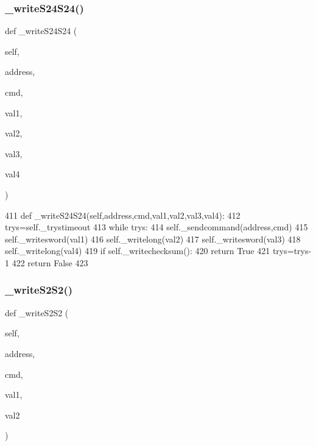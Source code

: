 \subsubsection{\texorpdfstring{\+\_\+write\+S24\+S24()}{\_writeS24S24()}}
{\footnotesize\ttfamily def \+\_\+write\+S24\+S24 (\begin{DoxyParamCaption}\item[{}]{self,  }\item[{}]{address,  }\item[{}]{cmd,  }\item[{}]{val1,  }\item[{}]{val2,  }\item[{}]{val3,  }\item[{}]{val4 }\end{DoxyParamCaption})\hspace{0.3cm}{\ttfamily [private]}}


\begin{DoxyCode}
411     \textcolor{keyword}{def }\_writeS24S24(self,address,cmd,val1,val2,val3,val4):
412         trys=self.\_trystimeout
413         \textcolor{keywordflow}{while} trys:
414             self.\_sendcommand(address,cmd)
415             self.\_writesword(val1)
416             self.\_writelong(val2)
417             self.\_writesword(val3)
418             self.\_writelong(val4)
419             \textcolor{keywordflow}{if} self.\_writechecksum():
420                 \textcolor{keywordflow}{return} \textcolor{keyword}{True}
421             trys=trys-1
422         \textcolor{keywordflow}{return} \textcolor{keyword}{False}
423 
\end{DoxyCode}
\mbox{\label{classtoxic__hardware_1_1roboclaw__3_1_1Roboclaw_ae7f3cc692531430614dd0f95fe2be1a9}} 
\subsubsection{\texorpdfstring{\+\_\+write\+S2\+S2()}{\_writeS2S2()}}
{\footnotesize\ttfamily def \+\_\+write\+S2\+S2 (\begin{DoxyParamCaption}\item[{}]{self,  }\item[{}]{address,  }\item[{}]{cmd,  }\item[{}]{val1,  }\item[{}]{val2 }\end{DoxyParamCaption})\hspace{0.3cm}{\ttfamily [private]}}


